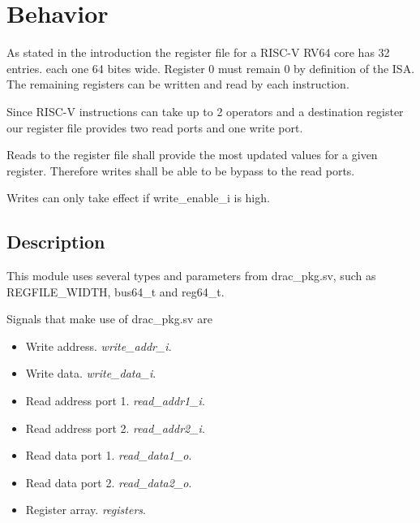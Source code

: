 \section{Behavior}

As stated in the introduction the register file for a RISC-V RV64 core has 32 entries. each one 64 bites wide.
Register 0 must remain 0 by definition of the ISA. The remaining registers can be written and read by each instruction.

Since RISC-V instructions can take up to 2 operators and a destination register our register file provides two read ports and one
write port.

Reads to the register file shall provide the most updated values for a given register. Therefore writes shall be able to be bypass to the read ports. 

Writes can only take effect if write\_enable\_i is high.

\subsection{Description}

This module uses several types and parameters from drac\_pkg.sv, such as REGFILE\_WIDTH, bus64\_t and reg64\_t. 

Signals that make use of drac\_pkg.sv are
\begin{itemize}
	\item Write address. \emph{write\_addr\_i}. 
	\item Write data. \emph{write\_data\_i}.
	\item Read address port 1. \emph{read\_addr1\_i}.
	\item Read address port 2. \emph{read\_addr2\_i}.
	\item Read data port 1. \emph{read\_data1\_o}.
	\item Read data port 2. \emph{read\_data2\_o}.
	\item Register array. \emph{registers}.
\end{itemize}


